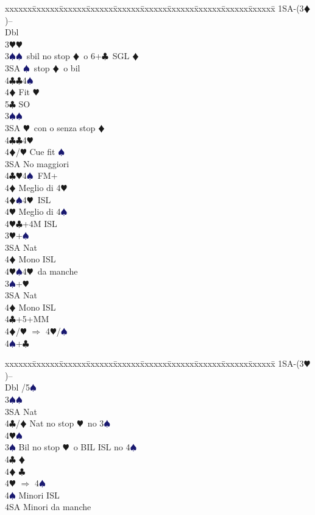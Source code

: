 \documentclass[a4paper,italian]{article}
\newcommand{\BC}{\textcolor{OliveGreen}{$\clubsuit$}}
\newcommand{\BD}{\textcolor{RedOrange}{$\vardiamondsuit$}}
\newcommand{\BH}{\textcolor{Red2}{$\varheartsuit${}}}
\newcommand{\BS}{\textcolor{MidnightBlue}{$\spadesuit${}}}
\newenvironment{bidtable}
{\begin{tabbing}

    xxxxxx\=xxxxxx\=xxxxxx\=xxxxxx\=xxxxxx\=xxxxxx\=xxxxxx\=xxxxxx\=xxxxxx\=xxxxxx\=\kill}
{\end{tabbing} }%
\begin{document}
\begin{multicols}{2}
    \begin{bidtable}
        1SA-(3\BD)--\+\\
        Dbl\+\\
        3\BH {}\BH \+\\
        3\BS {}\BS\ sbil no stop \BD\ o 6+\BC\ SGL \BD\\
        3SA \BS\ stop \BD\ o bil\\
        4\BC {}\BC4\BS\\
        4\BD \> Fit \BH \\
        5\BC \> SO\-\\
        3\BS {}\BS \+\\
        3SA \BH\ con o senza stop \BD \\
        4\BC {}\BC4\BH\\
        4\BD/\BH \> Cue fit \BS \-\\
        3SA \> No maggiori\+\\
        4\BC {}\BH 4\BS\ FM+\+\\
        4\BD \> Meglio di 4\BH \-\\
        4\BD {}\BS 4\BH\ ISL\+\\
        4\BH \> Meglio di 4\BS \-\\
        4\BH {}\BC +4M ISL\-\-\\
        3\BH {}+\BS \+\\
        3SA \> Nat\+\\
        4\BD \> Mono ISL\\
        4\BH {}\BS 4\BH\ da manche\-\-\\
        3\BS {}+\BH \+\\
        3SA \> Nat\+\\
        4\BD \> Mono ISL\-\-\\
        4\BC {}+5+MM\\
        4\BD/\BH \> $\Rightarrow$ 4\BH /\BS \\
        4\BS {}+\BC \-
    \end{bidtable}

    \begin{bidtable}
        1SA-(3\BH)--\+\\
        Dbl /5\BS\ \+\\
        3\BS{}\BS\ \\
        3SA\> Nat\\
        4\BC/\BD\> Nat no stop \BH\ no 3\BS\ \\
        4\BH{}\BS \-\\
        3\BS \> Bil no stop \BH\ o BIL ISL no 4\BS \\
        4\BC \> \BD \\
        4\BD \> \BC \\
        4\BH \> $\Rightarrow$ 4\BS \\
        4\BS \> Minori ISL\\
        4SA \> Minori da manche\-
    \end{bidtable}


\end{multicols}
\end{document}
